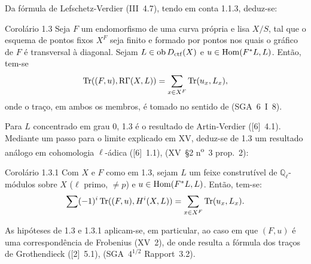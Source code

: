 Da fórmula de Lefschetz-Verdier (III~4.7), tendo em conta 1.1.3, deduz-se:

\begin{statement}{Corolário 1.3}
Seja $F$ um endomorfismo de uma curva própria e lisa $X/S$, tal que o esquema de pontos fixos $X^F$ seja finito e formado por pontos nos quais o gráfico de $F$ é transversal à diagonal. Sejam $L\in\operatorname{ob} D_{\mathrm{ctf}}(X)$ e $u\in\operatorname{Hom}(F^*L,L)$. Então, tem-se
\[
\operatorname{Tr}((F,u),\mathrm{R}\Gamma(X,L))=\sum_{x\in X^F}\operatorname{Tr}(u_x,L_x),
\]
onde o traço, em ambos os membros, é tomado no sentido de (SGA~6~I~8).
\end{statement}

Para $L$ concentrado em grau $0$, 1.3 é o resultado de Artin-Verdier ([6]~4.1). Mediante um passo para o limite explicado em XV, deduz-se de 1.3 um resultado análogo em cohomologia $\ell$-ádica ([6]~1.1), (XV~\S2 n\textsuperscript{o}~3 prop.~2):

\begin{statement}{Corolário 1.3.1}
Com $X$ e $F$ como em 1.3, sejam $L$ um feixe construtível de $\mathbb Q_\ell$-módulos sobre $X$ ($\ell$ primo, $\ne p$) e $u\in\operatorname{Hom}(F^*L,L)$. Então, tem-se:
\[
\sum(-1)^i\operatorname{Tr}((F,u),H^i(X,L))=\sum_{x\in X^F}\operatorname{Tr}(u_x,L_x).
\]
\end{statement}

As hipóteses de 1.3 e 1.3.1 aplicam-se, em particular, ao caso em que $(F,u)$ é uma correspondência de Frobenius (XV~2), de onde resulta a fórmula dos traços de Grothendieck ([2]~5.1), (SGA~$4^{1/2}$ Rapport~3.2).
